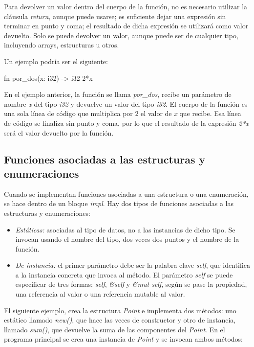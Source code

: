 Para devolver un valor dentro del cuerpo de la función, no es necesario utilizar la cláusula \textit{return}, aunque puede usarse; es suficiente dejar una expresión sin terminar en punto y coma; el resultado de dicha expresión se utilizará como valor devuelto. Solo se puede devolver un valor, aunque puede ser de cualquier tipo, incluyendo arrays, estructuras u otros.

Un ejemplo podría ser el siguiente:

\vspace{0.7em}
\begin{Codigo}
fn por_dos(x: i32) -> i32 {
   2*x
}
\end{Codigo}

En el ejemplo anterior, la función se llama \textit{por\_dos}, recibe un parámetro de nombre \textit{x} del tipo \textit{i32} y devuelve un valor del tipo \textit{i32}. El cuerpo de la función es una sola línea de código que multiplica por 2 el valor de \textit{x} que recibe. Esa línea de código se finaliza sin punto y coma, por lo que el resultado de la expresión \textit{2*x} será el valor devuelto por la función.

\subsection{Funciones asociadas a las estructuras y enumeraciones}
\noindent Cuando se implementan funciones asociadas a una estructura o una enumeración, se hace dentro de un bloque \textit{impl}. Hay dos tipos de funciones asociadas a las estructuras y enumeraciones:

\begin{itemize}
   \item \textit{Estáticas:} asociadas al tipo de datos, no a las instancias de dicho tipo. Se invocan usando el nombre del tipo, dos veces dos puntos y el nombre de la función.
   \item \textit{De instancia:} el primer parámetro debe ser la palabra clave \textit{self}, que identifica a la instancia concreta que invoca al método. El parámetro \textit{self} se puede especificar de tres formas: \textit{self}, \textit{\&self} y \textit{\&mut self}, según se pase la propiedad, una referencia al valor o una referencia mutable al valor. 
\end{itemize}

El siguiente ejemplo, crea la estructura \textit{Point} e implementa dos métodos: uno estático llamado \textit{new()}, que hace las veces de constructor y otro de instancia, llamado \textit{sum()}, que devuelve la suma de las componentes del \textit{Point}. En el programa principal se crea una instancia de \textit{Point} y se invocan ambos métodos:

